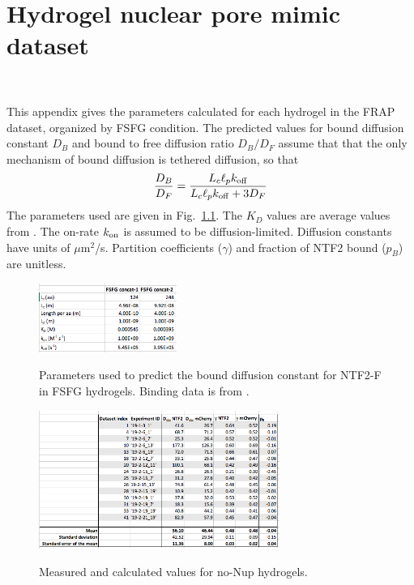 \chapter{Hydrogel nuclear pore mimic dataset}~\label{appx:dataset}

This appendix gives the parameters calculated for each hydrogel in the FRAP dataset, organized by FSFG condition.  The predicted values for bound diffusion constant $D_B$ and bound to free diffusion ratio $D_B/D_F$ assume that that the only mechanism of bound diffusion is tethered diffusion, so that $$\frac{D_B}{D_F}  = \frac{L_c \ell_p
    k_{\mathrm{off}}}{L_c \ell_p k_{\mathrm{off}} + 3D_F}$$
The parameters used are given in Fig.~\ref{fig:params}.  The $K_D$ values are average values from \cite{hayama18}.  The on-rate $k_{\rm on}$ is assumed to be diffusion-limited.  Diffusion constants have units of $\mu$m$^2$/s.  Partition coefficients ($\gamma$) and fraction of NTF2 bound ($p_B$) are unitless.

\begin{figure}
\caption[Parameters for predicted bound diffusion.]{Parameters used to predict the bound diffusion constant for NTF2-F in FSFG hydrogels.  Binding data is from \cite{hayama18}.  \\}
\centering
\includegraphics[width=0.4\textwidth]{figs/apps/dataset-params.png}
\label{fig:params}
\end{figure} 

\begin{figure}
\caption[No-Nup hydrogel dataset.]{Measured and calculated values for no-Nup hydrogels.}
\centering
\includegraphics[width=0.7\textwidth]{figs/apps/dataset-ctrl.png}
\label{fig:no-nup}
\end{figure} 

